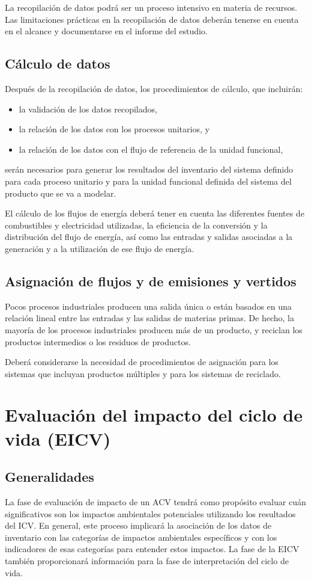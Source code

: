 La recopilación de datos podrá ser un proceso intensivo en materia de recursos. Las limitaciones prácticas en la recopilación de datos deberán tenerse en cuenta en el alcance y documentarse en el informe del estudio.

\subsection{Cálculo de datos}
Después de la recopilación de datos, los procedimientos de cálculo, que incluirán:
\begin{itemize}
  \item la validación de los datos recopilados,
  \item la relación de los datos con los procesos unitarios, y
  \item la relación de los datos con el flujo de referencia de la unidad funcional,
\end{itemize}

serán necesarios para generar los resultados del inventario del sistema definido para cada proceso unitario y para la unidad funcional definida del sistema del producto que se va a modelar.

El cálculo de los flujos de energía deberá tener en cuenta las diferentes fuentes de combustibles y electricidad utilizadas, la eficiencia de la conversión y la distribución del flujo de energía, así como las entradas y salidas asociadas a la generación y a la utilización de ese flujo de energía.

\subsection{Asignación de flujos y de emisiones y vertidos}
Pocos procesos industriales producen una salida única o están basados en una relación lineal entre las entradas y las salidas de materias primas. De hecho, la mayoría de los procesos industriales producen más de un producto, y reciclan los productos intermedios o los residuos de productos.

Deberá considerarse la necesidad de procedimientos de asignación para los sistemas que incluyan productos múltiples y para los sistemas de reciclado.

\section{Evaluación del impacto del ciclo de vida (EICV)}
\subsection{Generalidades}
La fase de evaluación de impacto de un ACV tendrá como propósito evaluar cuán significativos son los impactos ambientales potenciales utilizando los resultados del ICV. En general, este proceso implicará la asociación de los datos de inventario con las categorías de impactos ambientales específicos y con los indicadores de esas categorías para entender estos impactos. La fase de la EICV también proporcionará información para la fase de interpretación del ciclo de vida.

